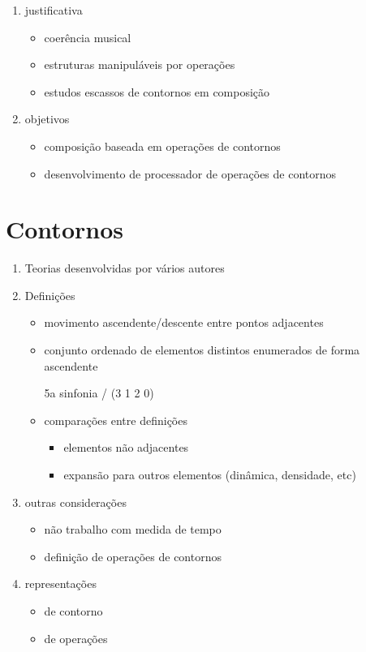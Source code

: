 \documentclass[12pt,a4paper]{article}
\begin{document}
\begin{enumerate}
\item justificativa
  \begin{itemize}
  \item coerência musical
  \item estruturas manipuláveis por operações
  \item estudos escassos de contornos em composição
  \end{itemize}
\item objetivos
  \begin{itemize}
  \item composição baseada em operações de contornos
  \item desenvolvimento de processador de operações de contornos
  \end{itemize}
\end{enumerate}

\section{Contornos}

\begin{enumerate}
\item Teorias desenvolvidas por vários autores
\item Definições
  \begin{itemize}
  \item movimento ascendente/descente entre pontos adjacentes 

  \item conjunto ordenado de elementos distintos enumerados de forma
    ascendente

    5a sinfonia / (3 1 2 0)
  \item comparações entre definições
    \begin{itemize}
    \item elementos não adjacentes
    \item expansão para outros elementos (dinâmica, densidade, etc)
    \end{itemize}
  \end{itemize}
\item outras considerações
  \begin{itemize}
  \item não trabalho com medida de tempo
  \item definição de operações de contornos
  \end{itemize}
\item representações
  \begin{itemize}
  \item de contorno
  \item de operações
  \end{itemize}
\end{enumerate}
\end{document}
